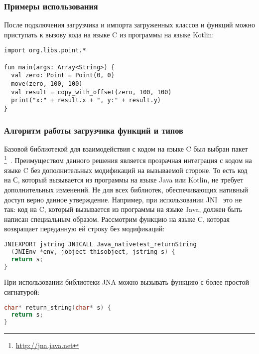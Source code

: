 \subsubsection{Примеры использования}
После подключения загрузчика и импорта загруженных классов и функций можно приступать к вызову кода на языке C из программы на языке Kotlin:
\begin{code}\begin{lstlisting}[caption={Пример работы с функциями и структурами данных, загруженных из заголовочного файла~\ref{point-h-example}.}, label=point-example]
import org.libs.point.*

fun main(args: Array<String>) {
  val zero: Point = Point(0, 0)
  move(zero, 100, 100)
  val result = copy_with_offset(zero, 100, 100)
  print("x:" + result.x + ", y:" + result.y)
}
\end{lstlisting}\end{code}
\subsubsection{Алгоритм работы загрузчика функций и типов}

Базовой библиотекой для взаимодействия с кодом на языке C был выбран пакет \footnote{\url{http://jna.java.net}}~\cite{jna-book}.
Преимуществом данного решения является прозрачная интеграция с кодом на языке C без дополнительных модификаций на вызываемой стороне.
То есть код на С, который вызывается из программы на языке Java или Kotlin, не требует дополнительных изменений.
Не для всех библиотек, обеспечивающих нативный доступ верно данное утверждение.
Например, при использовании JNI~\cite{jni-spec} это не так: код на C, который вызывается из программы на языке Java, должен быть написан специальным образом.
Рассмотрим функцию на языке C, которая возвращает переданную ей строку без модификаций:

\begin{code}\begin{lstlisting}[language=C, caption={Пример функции на языке C, которая доступна для вызова через библиотеку JNI.}, label=jni-example]
JNIEXPORT jstring JNICALL Java_nativetest_returnString
  (JNIEnv *env, jobject thisobject, jstring s) {
  return s;
}
\end{lstlisting}\end{code}

При использовании библиотеки JNA можно вызывать функцию с более простой сигнатурой:
\begin{code}\begin{lstlisting}[language=C, caption={Пример функции на языке C, аналогичной функции из примера~\ref{jni-example}, которая доступна для вызова через библиотеку JNA.}, label=jna-example]
char* return_string(char* s) {
  return s;
}
\end{lstlisting}\end{code}

